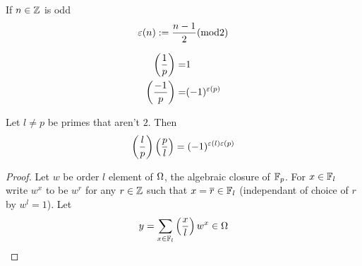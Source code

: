 \begin{dfn}[$\ep(n)$]
    If $n \in \mathbb{Z}$ is odd 
    \[\varepsilon(n):=\frac{n-1}{2} (\mathrm{mod} 2)\]
\end{dfn}

\begin{prop}[Computations]
    \begin{align*}
        \left(\frac{1}{p}\right) =& 1\\
        \left(\frac{-1}{p}\right) =& (-1)^{\varepsilon(p)}
    \end{align*}
\end{prop}

\begin{prop}
    Let $l \ne p$ be primes that aren't $2$.
    Then \[\left(\frac{l}{p}\right)\left(\frac{p}{l}\right) = (-1)^{\varepsilon(l)\varepsilon(p)}\]
\end{prop}
\begin{proof}
    Let $w$ be order $l$ element of $\Omega$,
    the algebraic closure of $\mathbb{F}_p$.
    For $x \in \mathbb{F}_l$ write $w^x$ to be $w^r$ for any $r \in \mathbb{Z}$ such that
    $x = \overline{r} \in \mathbb{F}_l$ (independant of choice of $r$ by $w^l = 1$).
    Let 
    \[y = \sum_{x\in \mathbb{F}_l} \left(\frac{x}{l}\right) w^x \in \Omega\]


\end{proof}

